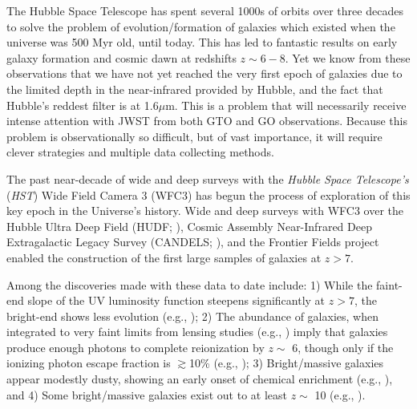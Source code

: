 \documentclass[12pt]{article}
\begin{document}
The Hubble Space Telescope has spent several 1000s of orbits over three decades to solve the problem of evolution/formation of galaxies which existed when the universe was 500 Myr old, until today. This has led to fantastic results on early galaxy formation and cosmic dawn at redshifts $z \sim 6-8$. Yet we know from these observations that we have not yet reached the very first epoch of galaxies due to the limited depth in the near-infrared provided by Hubble, and the fact that Hubble's reddest filter is at 1.6$\mu$m. This is a problem that will necessarily receive intense attention with JWST from both GTO and GO observations.  Because this problem is observationally so difficult, but of vast importance, it will require clever strategies and multiple data collecting methods.

The past near-decade of wide and deep surveys with the {\it Hubble Space Telescope’s} ({\it HST}) Wide Field Camera 3 (WFC3) has begun the process of exploration of this key epoch in the Universe’s history.  Wide and deep surveys with WFC3 over the Hubble Ultra Deep Field (HUDF; \citealt{Beckwith2006, Bouwens2010, Dunlop2013}), Cosmic Assembly Near-Infrared Deep Extragalactic Legacy Survey (CANDELS; \citealt{Grogin2011, Koekemoer2011}), and the Frontier Fields project \citep{Lotz2017} enabled the construction of the first large samples of galaxies at $z>7$.  

Among the discoveries made with these data to date include: 1) While the faint-end slope of the UV luminosity function steepens significantly at $z>7$, the bright-end shows less evolution (e.g., \citealt{Bouwens2015, Finkelstein2015}); 2) The abundance of galaxies, when integrated to very faint limits from lensing studies (e.g., \citealt{Atek2015, Livermore2017}) imply that galaxies produce enough photons to complete reionization by $z\sim$ 6, though only if the ionizing photon escape fraction is $\gtrsim$10\% (e.g., \citealt{Duncan2015, Robertson2015}); 3) Bright/massive galaxies appear modestly dusty, showing an early onset of chemical enrichment (e.g., \citealt{Finkelstein2012, Bouwens2014}), and 4) Some bright/massive galaxies exist out to at least $z \sim$ 10 (e.g., \citealt{Oesch2016, Salmon2018}).
\end{document}
